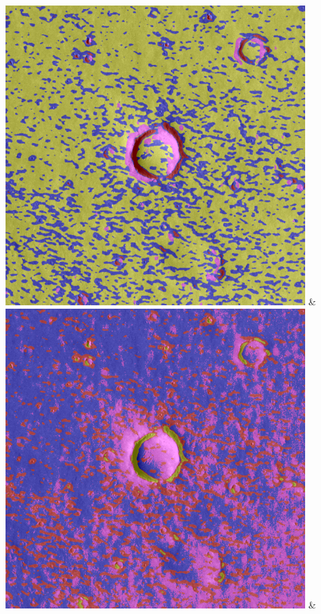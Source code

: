 \begin{table}[h!]
\begin{tabularx}{\textwidth}
		\includegraphics[width=0.9\linewidth]{images/gen/color_weight/p03_01.png_1.00.png} &
		\includegraphics[width=0.9\linewidth]{images/gen/color_weight/p03_01.png_1.33.png} &

\end{tabularx}
\end{table}
